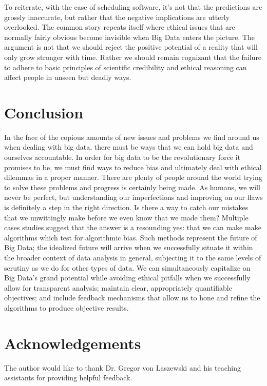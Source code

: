 \documentclass[sigconf]{acmart}
\begin{document}
To reiterate, with the case of scheduling software, it's not that the predictions are grossly inaccurate, but rather that the negative implications are utterly overlooked. The common story repeats itself where ethical issues that are normally fairly obvious become invisible when Big Data enters the picture. The argument is not that we should reject the positive potential of a reality that will only grow stronger with time. Rather we should remain cognizant that the failure to adhere to basic principles of scientific credibility and ethical reasoning can affect people in unseen but deadly ways.

\section{Conclusion}

In the face of the copious amounts of new issues and problems we find around us when dealing with big data, there must be ways that we can hold big data and ourselves accountable. In order for big data to be the revolutionary force it promises to be, we must find ways to reduce bias and ultimately deal with ethical dilemmas in a proper manner. There are plenty of people around the world trying to solve these problems and progress is certainly being made. As humans, we will never be perfect, but understanding our imperfections and improving on our flaws is definitely a step in the right direction. Is there a way to catch our mistakes that we unwittingly make before we even know that we made them? Multiple cases studies suggest that the answer is a resounding yes: that we can make make algorithms which test for algorithmic bias. Such methods represent the future of Big Data; the idealized future will arrive when we successfully situate it within the broader context of data analysis in general, subjecting it to the same levels of scrutiny as we do for other types of data. We can simultaneously capitalize on Big Data's grand potential while avoiding ethical pitfalls when we successfully allow for transparent analysis; maintain clear, appropriately quantifiable objectives; and include feedback mechanisms that allow us to hone and refine the algorithms to produce objective results. 


\section{Acknowledgements}
The author would like to thank Dr. Gregor von Laszewski and his teaching assistants for providing helpful feedback.



 
\end{document}
